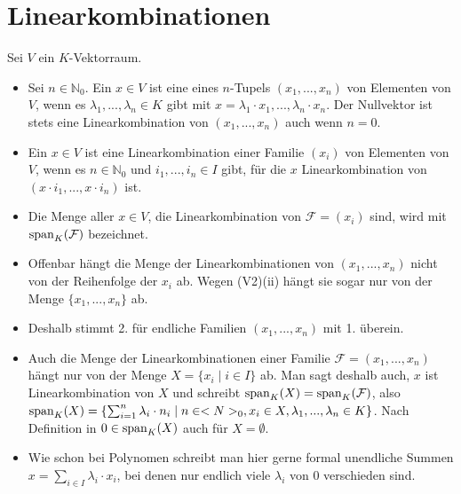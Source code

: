 \section{Linearkombinationen}

Sei $V$ ein $K$-Vektorraum.

\begin{definition}[Linearkombination]
	\begin{itemize}
		\item Sei $n \in \mathbb N_0$. Ein $x \in V$ ist eine  eines $n$-Tupels $(x_1,...,x_n)$ von 
		Elementen von $V$, wenn es $\lambda_1,...,\lambda_n \in K$ gibt mit $x=\lambda_1\cdot x_1,...,\lambda_n \cdot
		x_n$. Der Nullvektor ist stets eine Linearkombination von $(x_1,...,x_n)$ auch wenn $n=0$.
		\item Ein $x\in V$ ist eine Linearkombination einer Familie $(x_i)$ von Elementen von $V$, wenn es $n \in \mathbb
		N_0$ und $i_1,...,i_n \in I$ gibt, für die $x$ Linearkombination von $(x\cdot i_1,...,x\cdot i_n)$ ist.
		\item Die Menge aller $x \in V$, die Linearkombination von $\mathcal F=(x_i)$ sind, wird mit $\operatorname{span}_K(\mathcal F)$ 
		bezeichnet.
	\end{itemize}
\end{definition}

\begin{remark}
	\begin{itemize}
		\item Offenbar hängt die Menge der Linearkombinationen von $(x_1,...,x_n)$ nicht von der Reihenfolge der $x_i$ ab. 
		Wegen (V2)(ii) hängt sie sogar nur von der Menge $\{x_1,...,x_n\}$ ab.
		\item Deshalb stimmt 2. für endliche Familien $(x_1,...,x_n)$ mit 1. überein.
		\item Auch die Menge der Linearkombinationen einer Familie $\mathcal F=(x_1,...,x_n)$ hängt nur von der Menge $X=
		\{x_i \mid i \in I\}$ ab. Man sagt deshalb auch, $x$ ist Linearkombination von $X$ und schreibt $\operatorname{span}_K(X)=\operatorname{span}_K(
		\mathcal F)$, also $\operatorname{span}_K(X)=\{\sum _{i=1}^n \lambda_i\cdot n_i \mid n \in <N>_0, x_i \in X, \lambda_1,
		...,\lambda_n \in K\}$. Nach Definition in $0 \in \operatorname{span}_K(X)$ auch für $X=\emptyset$.
		\item Wie schon bei Polynomen schreibt man hier gerne formal unendliche Summen $x=\sum_{i \in I} \lambda_i
		\cdot x_i$, bei denen nur endlich viele $\lambda_i$ von 0 verschieden sind.
	\end{itemize}
\end{remark}

